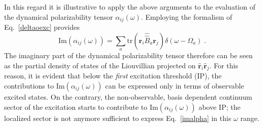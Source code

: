 \documentclass[reprint,aps,prb]{revtex4-1}
\newcommand{\be}{\begin{equation}}
\newcommand{\ee}{\end{equation}}
\newcommand{\lb}{\label}
\newcommand{\op}[1]{\hat {#1}}
\newcommand{\sop}[1]{\op{\op {#1}}}
\newcommand{\trace}[1]{\mathrm{tr}\left(#1\right)}
\begin{document}
In this regard it is illustrative to apply the above arguments to the evaluation of the dynamical polarizability tensor $\alpha_{ij}(\omega)$.
Employing the formalism of Eq.~\eqref{deltaoexc} provides
\be%
  \mathrm{Im}\left(\alpha_{ij}(\omega) \right) =
  \sum_{a} \trace{\mathbf r_i \sop B_a \mathbf r_j} \delta(\omega - \Omega_a)\lb{imalpha} \;.
\ee%
The imaginary part of the dynamical polarizability tensor therefore can be seen as the partial density of states of the Liouvillian projected on
$\op{\mathbf r}_i\op{\mathbf r}_j$. For this reason, it is evident that below the \emph{first} excitation threshold (IP), the contributions to $\mathrm{Im}\left(\alpha_{ij}(\omega)\right)$ can be expressed only in terms of observable excited states. On the contrary, the non-observable, basis dependent continuum sector of the excitation starts to contribute to $\mathrm{Im}\left(\alpha_{ij}(\omega)\right)$ above IP; the localized sector is not anymore sufficient to express Eq.~\eqref{imalpha} in this $\omega$ range.

\end{document}
